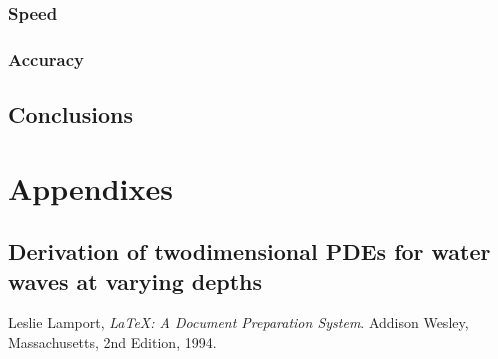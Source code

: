 \documentclass[]{report}
\begin{document}
\section{Speed}

\section{Accuracy}

\chapter{Conclusions}


\part{Appendixes}

\appendix
\chapter{Derivation of twodimensional PDEs for water waves at varying depths}


\iffalse




\else

\begin{thebibliography}{99}
    
    Leslie Lamport,
    \emph{\LaTeX: A Document Preparation System}.
    Addison Wesley, Massachusetts,
    2nd Edition,
    1994.
    
\end{thebibliography}

\fi
\end{document}
